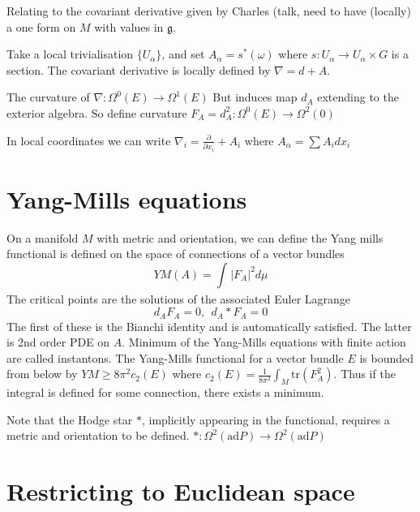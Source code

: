 Relating to the covariant derivative given by Charles (talk, need to have (locally) a one form on $M$ with values in $ \mathfrak{g} $. 

Take a local trivialisation $ \{U_\alpha \} $, 
and set $ A_\alpha = s^* (\omega) $ 
where $ s: U_\alpha \rightarrow U_\alpha \times G $ is a section. 
The covariant derivative is locally defined by $ \nabla = d + A $.

The curvature of $ \nabla : \Omega^0 ( E) \rightarrow  \Omega^1 ( E) $
But induces map $d_A$ extending to the exterior algebra. 
So define curvature $F_A = d_A ^2 : \Omega^0 ( E ) \rightarrow \Omega^2(0)$ 

In local coordinates we can write 
$\nabla _i = \frac{\partial}{\partial x_i } + A_i $ where 
$ A_\alpha = \sum A_i dx_i $



\section{Yang-Mills equations} %

On a manifold $M$ with metric and orientation, 
we can define the Yang mills functional is defined on the space of connections of a vector bundles
\begin{equation}
    YM(A) = \int _{} | F_A | ^2 d \mu 
\end{equation}
The critical points are the solutions of the associated Euler Lagrange
\begin{equation}
     d_A F_A = 0, ~~ d_A * F_A = 0 
\end{equation}
The first of these is the Bianchi identity and is automatically satisfied. 
The latter is 2nd order PDE on $A$.
Minimum of the Yang-Mills equations with finite action are called instantons.  
The Yang-Mills functional for a vector bundle $E$ is bounded from below by $ YM \geq 8 \pi ^2 c_2 (E) $ 
where $ c_2 (E) = \frac{1}{8 \pi^2} \int_M \mathrm{tr} (F_A ^2) $. 
Thus if the integral is defined for some connection, there exists a minimum. 

Note that the Hodge star $*$, implicitly appearing in the functional, requires a metric and orientation to be defined.  
  $ * : \Omega^2(\mathrm{ad}P)  \rightarrow  \Omega^2(\mathrm{ad}P) $ 


\section{Restricting to Euclidean space} %


